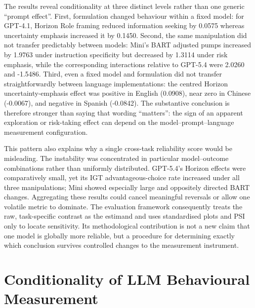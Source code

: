 \documentclass[logo,msc,inf]{infthesis}       %
\begin{document}
The results reveal conditionality at three distinct levels rather than one generic ``prompt effect''. First, formulation changed behaviour within a fixed model: for GPT-4.1, Horizon Role framing reduced information seeking by 0.0575 whereas uncertainty emphasis increased it by 0.1450. Second, the same manipulation did not transfer predictably between models: Mini's BART adjusted pumps increased by 1.9763 under instruction specificity but decreased by 1.3114 under risk emphasis, while the corresponding interactions relative to GPT-5.4 were 2.0260 and -1.5486. Third, even a fixed model and formulation did not transfer straightforwardly between language implementations: the centred Horizon uncertainty-emphasis effect was positive in English (0.0908), near zero in Chinese (-0.0067), and negative in Spanish (-0.0842). The substantive conclusion is therefore stronger than saying that wording ``matters'': the sign of an apparent exploration or risk-taking effect can depend on the model--prompt--language measurement configuration.

This pattern also explains why a single cross-task reliability score would be misleading. The instability was concentrated in particular model--outcome combinations rather than uniformly distributed. GPT-5.4's Horizon effects were comparatively small, yet its IGT advantageous-choice rate increased under all three manipulations; Mini showed especially large and oppositely directed BART changes. Aggregating these results could cancel meaningful reversals or allow one volatile metric to dominate. The evaluation framework consequently treats the raw, task-specific contrast as the estimand and uses standardised plots and PSI only to locate sensitivity. Its methodological contribution is not a new claim that one model is globally more reliable, but a procedure for determining exactly which conclusion survives controlled changes to the measurement instrument.

\section{Conditionality of LLM Behavioural Measurement}
\end{document}
